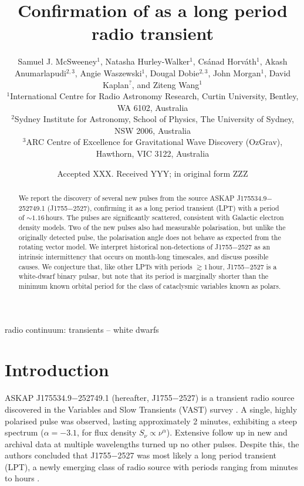 \documentclass[fleqn,usenatbib]{mnras}
\title[Confirmation of \src{} as LPT]{Confirmation of \srcfull{} as a long period radio transient}
\author[S. J. McSweeney et al.]{
Samuel J. McSweeney$^{1}$,
Natasha Hurley-Walker$^{1}$,
Cs\'{a}nad Horv\'{a}th$^{1}$,
Akash Anumarlapudi$^{2,3}$,
\newauthor
Angie Waszewski$^{1}$,
Dougal Dobie$^{2,3}$,
John Morgan$^{1}$,
David Kaplan$^{?}$,
and Ziteng Wang$^{1}$
\\
$^{1}$International Centre for Radio Astronomy Research, Curtin University, Bentley, WA 6102, Australia\\
$^{2}$Sydney Institute for Astronomy, School of Physics, The University of Sydney, NSW 2006, Australia\\
$^{3}$ARC Centre of Excellence for Gravitational Wave Discovery (OzGrav), Hawthorn, VIC 3122, Australia
}
\date{Accepted XXX. Received YYY; in original form ZZZ}
\newcommand{\src}{J1755$-$2527}
\newcommand{\srcfull}{ASKAP J175534.9$-$252749.1}
\begin{document}
\label{firstpage}
\pagerange{\pageref{firstpage}--\pageref{lastpage}}
\maketitle

\begin{abstract}
We report the discovery of several new pulses from the source \srcfull{} (\src{}), confirming it as a long period transient (LPT) with a period of ${\sim}1.16\,$hours. The pulses are significantly scattered, consistent with Galactic electron density models. Two of the new pulses also had measurable polarisation, but unlike the originally detected pulse, the polarisation angle does not behave as expected from the rotating vector model. We interpret historical non-detections of \src{} as an intrinsic intermittency that occurs on month-long timescales, and discuss possible causes. We conjecture that, like other LPTs with periods $\gtrsim 1\,$hour, \src{} is a white-dwarf binary pulsar, but note that its period is marginally shorter than the minimum known orbital period for the class of cataclysmic variables known as polars.
\end{abstract}

\begin{keywords}
radio continuum: transients -- white dwarfs
\end{keywords}



\section{Introduction} \label{sec:introduction}

\srcfull{} (hereafter, \src{}) is a transient radio source discovered in the Variables and Slow Transients (VAST) survey \citep[][hereafter ]{2024MNRAS.535..909D}.
A single, highly polarised pulse was observed, lasting approximately 2 minutes, exhibiting a steep spectrum ($\alpha = -3.1$, for flux density $S_\nu\propto\nu^\alpha$).
Extensive follow up in new and archival data at multiple wavelengths turned up no other pulses.
Despite this, the authors concluded that \src{} was most likely a long period transient (LPT), a newly emerging class of radio source with periods ranging from minutes to hours \citep[see e.g.][]{2022Natur.601..526H,2023Natur.619..487H,2024NatAs...8.1159C}.
\end{document}
